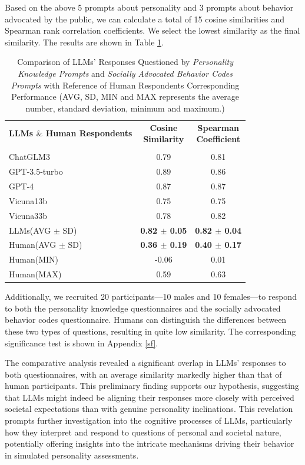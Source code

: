\documentclass{article}
\theoremstyle{plain}
\theoremstyle{definition}
\theoremstyle{remark}
\begin{document}
\begin{CJK*}{UTF8}{gbsn}
Based on the above 5 prompts about personality and 3 prompts about behavior advocated by the public, we can calculate a total of 15 cosine similarities and Spearman rank correlation coefficients. We select the lowest similarity as the final similarity. The results are shown in Table \ref{table-task1}.

\begin{table}
\caption{\label{table-task1} Comparison of LLMs' Responses Questioned by \textit{Personality Knowledge Prompts} and \textit{Socially Advocated Behavior Codes Prompts} with Reference of Human Respondents Corresponding Performance (AVG, SD, MIN and MAX represents the average number, standard deviation, minimum and maximum.)}
\vskip 0.15in
\centering
\begin{tabular}{lcc}
\toprule
\multirowcell{2}{\bf LLMs $\&$ Human\\\bf Respondents} & \multirowcell{2}{\bf Cosine \\\bf Similarity} & \multirowcell{2}{\bf Spearman \\\bf Coefficient} \\
             &  &  \\
\midrule
ChatGLM3          & 0.79 & 0.81   \\
GPT-3.5-turbo    & 0.89 & 0.86   \\
GPT-4            & 0.87 & 0.87   \\
Vicuna13b        & 0.75 & 0.75   \\
Vicuna33b        & 0.78 & 0.82   \\
LLMs(AVG $\pm$ SD)         & \bf 0.82 $\pm$ 0.05 & \bf 0.82 $\pm$ 0.04   \\
\midrule
Human(AVG $\pm$ SD)             & \bf 0.36 $\pm$ 0.19 & \bf 0.40 $\pm$ 0.17  \\
Human(MIN)            & -0.06 & 0.01    \\
Human(MAX)            & 0.59 & 0.63   \\
\bottomrule
\end{tabular}
\vskip -0.1in
\end{table}

Additionally, we recruited 20 participants—10 males and 10 females—to respond to both the personality knowledge questionnaires and the socially advocated behavior codes questionnaire. Humans can distinguish the differences between these two types of questions, resulting in quite low similarity. The corresponding significance test is shown in Appendix \ref{sf}.

The comparative analysis revealed a significant overlap in LLMs' responses to both questionnaires, with an average similarity markedly higher than that of human participants. This preliminary finding supports our hypothesis, suggesting that LLMs might indeed be aligning their responses more closely with perceived societal expectations than with genuine personality inclinations. This revelation prompts further investigation into the cognitive processes of LLMs, particularly how they interpret and respond to questions of personal and societal nature, potentially offering insights into the intricate mechanisms driving their behavior in simulated personality assessments.
\fi


\end{CJK*}
\end{document}
